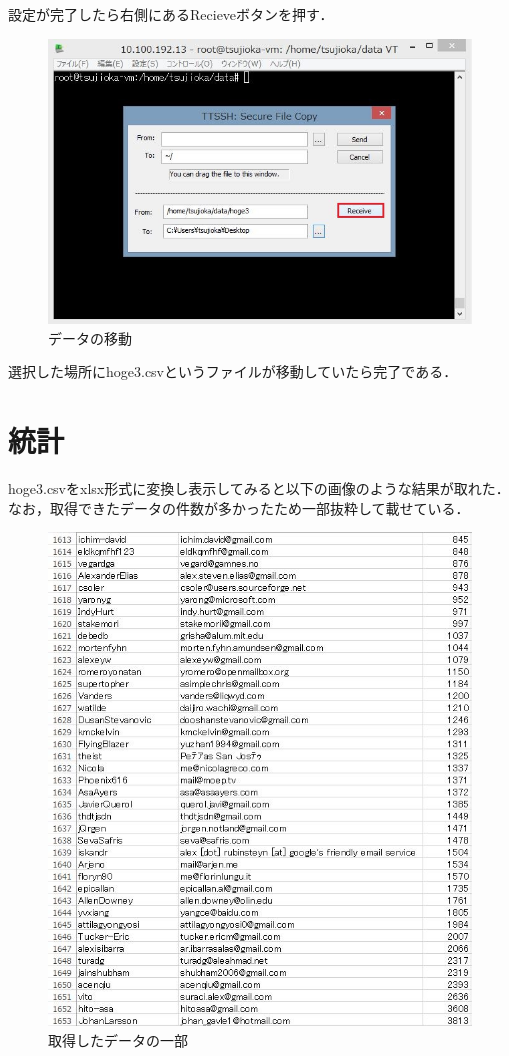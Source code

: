 設定が完了したら右側にあるRecieveボタンを押す．

\begin{figure}[htb]
\centering
\includegraphics[width=14cm]{sshscp5.JPG}
\caption{データの移動}\label{サンプル図}
\end{figure}

選択した場所にhoge3.csvというファイルが移動していたら完了である．

\newpage

\section{統計}
hoge3.csvをxlsx形式に変換し表示してみると以下の画像のような結果が取れた．なお，取得できたデータの件数が多かったため一部抜粋して載せている．


\begin{figure}[htb]
\centering
\includegraphics[width=12cm]{data2.JPG}
\caption{取得したデータの一部}\label{サンプル図}
\end{figure}

